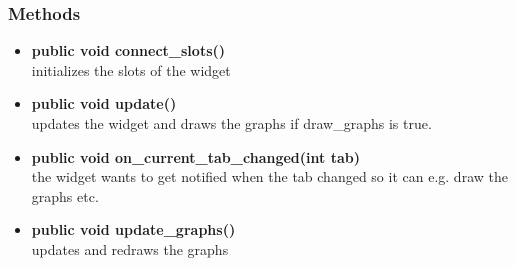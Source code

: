 \subsubsection{Methods}
\begin{itemize}
  \item \textbf{public void connect\_slots()}\\
  initializes the slots of the widget
  \item \textbf{public void update()}\\
  updates the widget and draws the graphs if draw\_graphs is true. 
  \item \textbf{public void on\_current\_tab\_changed(int tab)}\\
  the widget wants to get notified when the tab changed so it can e.g. draw the graphs etc.
  \item \textbf{public void update\_graphs()}\\
  updates and redraws the graphs
\end{itemize}

\newpage
